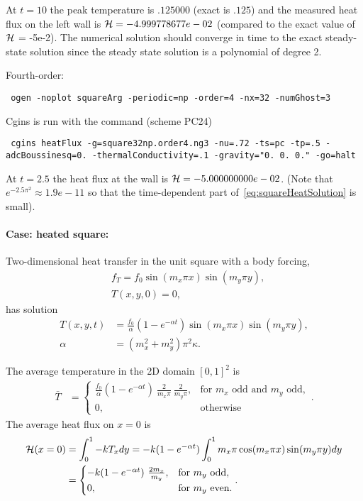 At $t=10$ the peak temperature is $.125000$ (exact is $.125$) and the measured heat flux on the left wall is ${\mathcal H} = -4.999778677e-02$ (compared
to the exact value of ${\mathcal H}$ = -5e-2). The numerical solution should converge in time to the exact steady-state solution since the 
steady state solution is a polynomial of degree 2.

Fourth-order: 
\begin{flushleft}\tt\small
  ogen -noplot squareArg -periodic=np -order=4 -nx=32 -numGhost=3
\end{flushleft}
Cgins is run with the command (scheme PC24)
\begin{flushleft}\tt\small
  cgins heatFlux -g=square32np.order4.ng3 -nu=.72 -ts=pc -tp=.5 -adcBoussinesq=0. -thermalConductivity=.1 -gravity="0. 0. 0." -go=halt
\end{flushleft}
At $t=2.5$ the heat flux at the wall is ${\mathcal H} = -5.000000000e-02$. (Note that $e^{-2.5 \pi^2}\approx 1.9e-11$ so that the time-dependent
part of~\eqref{eq:squareHeatSolution} is small).


\paragraph{Case: heated square:} Two-dimensional heat transfer in the unit square with a body forcing,
\begin{align}
  &  f_T = f_0 \sin(m_x\pi x)\sin(m_y \pi y)  , \\
  &  T(x,y,0) = 0 , 
\end{align}
has solution
\begin{align}
    T(x,y,t) &= \frac{f_0}{\alpha} ( 1 - e^{-\alpha t}) \sin(m_x\pi x)\sin(m_y \pi y)  , \\
    \alpha &= ( m_x^2 + m_y^2 ) \pi^2 \kappa. 
\end{align}

The average temperature in the 2D domain $[0,1]^2$ is 
\begin{align}
    \bar{T} &=
  \begin{cases} 
 \frac{f_0}{\alpha} ( 1 - e^{-\alpha t}) ~ \frac{2}{m_x \pi}~ \frac{2}{m_y \pi},  & \text{for $m_x$ odd and $m_y$ odd},\\
            0 , &  \text{otherwise} 
  \end{cases} .
\end{align}
The average heat flux on $x=0$ is
\begin{align}
   {\mathcal H}(x=0) & = \int_0^1 -k T_x dy = -k ( 1 - e^{-\alpha t}) \int_0^1 m_x \pi \cos(m_x\pi x) \sin(m_y \pi y) dy \\
            &= 
          \begin{cases} 
            - k( 1 - e^{-\alpha t}) ~ \frac{2 m_x}{m_y} , & \text{for $m_y$ odd},\\
            0 , & \text{for $m_y$ even}.
          \end{cases} .
\end{align}

